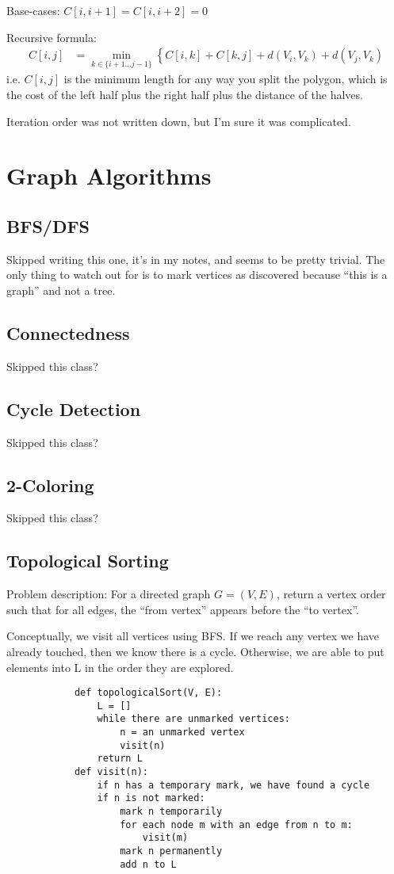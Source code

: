         Base-cases: $C[i, i+1] = C[i, i+2] = 0$

        Recursive formula:
        \begin{align*}
            C[i, j] &= \min_{k \in \{ i+1 \ldots j-1 \}} \left\{
                C[i, k] + C[k, j] + d(V_i, V_k) + d(V_j, V_k)
            \right.
        \end{align*}
        i.e. $C[i, j]$ is the minimum length for any way you split the polygon,
        which is the cost of the left half plus the right half plus the distance
        of the halves.

        Iteration order was not written down, but I'm sure it was complicated.

\chapter{Graph Algorithms}
    \section{BFS/DFS}
        Skipped writing this one, it's in my notes, and seems to be pretty
        trivial. The only thing to watch out for is to mark vertices as
        discovered because ``this is a graph'' and not a tree.

    \section{Connectedness}
        Skipped this class?
    \section{Cycle Detection}
        Skipped this class?
    \section{2-Coloring}
        Skipped this class?
    \section{Topological Sorting}
        Problem description: For a directed graph $G=(V, E)$, return a vertex
        order such that for all edges, the ``from vertex'' appears before the
        ``to vertex''.

        Conceptually, we visit all vertices using BFS. If we reach any vertex
        we have already touched, then we know there is a cycle. Otherwise, we
        are able to put elements into L in the order they are explored.
        \begin{verbatim}
            def topologicalSort(V, E):
                L = []
                while there are unmarked vertices:
                    n = an unmarked vertex
                    visit(n)
                return L
            def visit(n):
                if n has a temporary mark, we have found a cycle
                if n is not marked:
                    mark n temporarily
                    for each node m with an edge from n to m:
                        visit(m)
                    mark n permanently
                    add n to L
        \end{verbatim}
